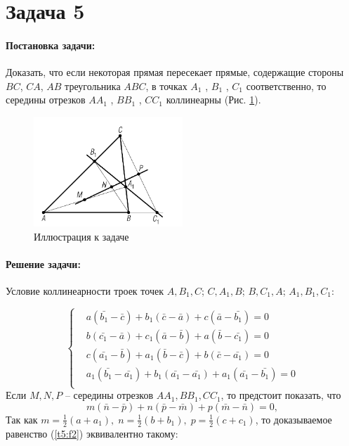 {
   \section*{Задача 5}
   \paragraph{Постановка задачи:}
   Доказать, что если некоторая прямая пересекает прямые, содержащие стороны
   \(BC\), \(CA\), \(AB\) треугольника \(ABC\), в точках \(A_1\) , \(B_1\) , \(C_1\)
   соответственно, то середины отрезков \(AA_1\) , \(BB_1\) , \(CC_1\) коллинеарны (Рис. \ref{t5:im}).
   \begin{figure}[h]
      \centering
      \includegraphics[width=0.5\textwidth]{images/task5.png}
      \caption{Иллюстрация к задаче}
      \label{t5:im}
   \end{figure}
   \paragraph{Решение задачи:}
   Условие коллинеарности троек точек \(A, B_1 , C\); \(C,
   A_1 , B\); \(B, C_1 , A\); \(A_1 , B_1 , C_1\):

   \begin{equation}
      \left\{ \begin{aligned}
          & a(\bar{b_1} - \bar{c}) + b_1(\bar{c} - \bar{a}) + c(\bar{a} - \bar{b_1}) = 0             \\
          & b(\bar{c_1} - \bar{a}) + c_1(\bar{a} - \bar{b}) + a(\bar{b} - \bar{c_1}) = 0             \\
          & c(\bar{a_1} - \bar{b}) + a_1(\bar{b} - \bar{c}) + b(\bar{c} - \bar{a_1}) = 0             \\
          & a_1(\bar{b_1} - \bar{a_1}) + b_1(\bar{a_1} - \bar{a_1}) + a_1(\bar{a_1} - \bar{b_1}) = 0 \\
      \end{aligned}
      \right. \label{t5:f1}
   \end{equation}
   Если \(M, N, P\) -- середины отрезков \(AA_1, BB_1, CC_1\), то предстоит показать, что
   \begin{equation}
      m(\bar{n} -\bar{p})+n(\bar{p}-\bar{m})+p(\bar{m}-\bar{n})=0,
      \label{t5:f2}
   \end{equation}
   Так как \(\displaystyle
   m=\frac{1}{2}(a+a_1),\;
   n=\frac{1}{2}(b+b_1),\;
   p=\frac{1}{2}(c+c_1)
   \), то доказываемое равенство (\ref{t5:f2}) эквивалентно такому:

}
